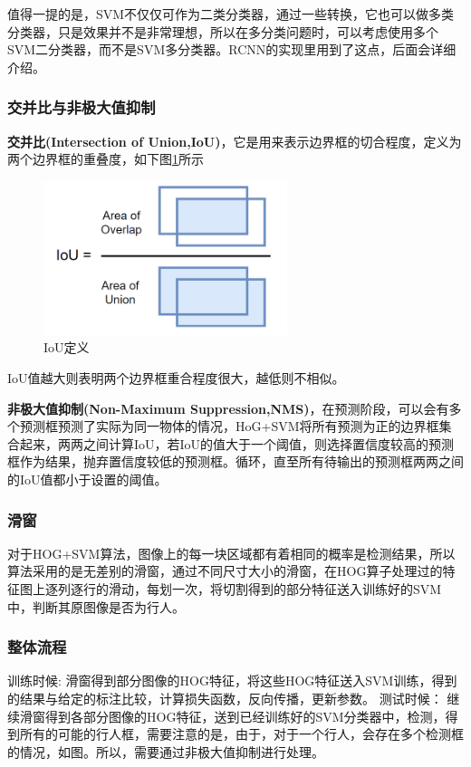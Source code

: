 \documentclass[12pt,a4paper,titlepage]{article}
\begin{document}
值得一提的是，SVM不仅仅可作为二类分类器，通过一些转换，它也可以做多类分类器，只是效果并不是非常理想，所以在多分类问题时，可以考虑使用多个SVM二分类器，而不是SVM多分类器。RCNN的实现里用到了这点，后面会详细介绍。

\subsubsection{交并比与非极大值抑制}
\textbf{交并比(Intersection of Union,IoU)}，它是用来表示边界框的切合程度，定义为两个边界框的重叠度，如下图\ref{fig:iou}所示
\begin{figure}[h]
\centering
\includegraphics[height=4.5cm]{img/iou.png}
\caption{IoU定义}
\label{fig:iou}
\end{figure}

IoU值越大则表明两个边界框重合程度很大，越低则不相似。

\textbf{非极大值抑制(Non-Maximum Suppression,NMS)}，在预测阶段，可以会有多个预测框预测了实际为同一物体的情况，HoG+SVM将所有预测为正的边界框集合起来，两两之间计算IoU，若IoU的值大于一个阈值，则选择置信度较高的预测框作为结果，抛弃置信度较低的预测框。循环，直至所有待输出的预测框两两之间的IoU值都小于设置的阈值。
\subsubsection{滑窗}
对于HOG+SVM算法，图像上的每一块区域都有着相同的概率是检测结果，所以算法采用的是无差别的滑窗，通过不同尺寸大小的滑窗，在HOG算子处理过的特征图上逐列逐行的滑动，每划一次，将切割得到的部分特征送入训练好的SVM中，判断其原图像是否为行人。
\subsubsection{整体流程}
训练时候:
滑窗得到部分图像的HOG特征，将这些HOG特征送入SVM训练，得到的结果与给定的标注比较，计算损失函数，反向传播，更新参数。
测试时候：
继续滑窗得到各部分图像的HOG特征，送到已经训练好的SVM分类器中，检测，得到所有的可能的行人框，需要注意的是，由于，对于一个行人，会存在多个检测框的情况，如图。所以，需要通过非极大值抑制进行处理。
\end{document}
